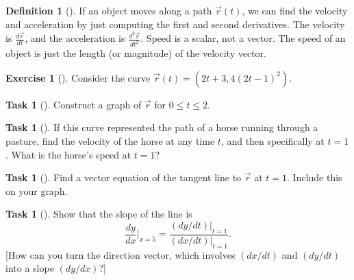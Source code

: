\documentclass[10pt,]{book}
\theoremstyle{plain}
\theoremstyle{definition}
\newtheorem{definition}[theorem]{Definition}
\theoremstyle{definition}
\theoremstyle{definition}
\theoremstyle{definition}
\newtheorem{exploration}[project]{Exercise}
\newtheorem{task}[project]{Task}
\theoremstyle{definition}
\numberwithin{equation}{section}
\newcommand{\ds}{\displaystyle}
\begin{document}
\begin{definition}[{}]\label{def_velocity_acceleration}
If an object moves along a path \(\vec r(t)\), we can find the velocity and acceleration by just computing the first and second derivatives. The velocity is \(\frac{d\vec r}{dt}\), and the acceleration is \(\frac{d^2\vec r}{dt^2}\). Speed is a scalar, not a vector. The speed of an object is just the length (or magnitude) of the velocity vector.%
\end{definition}
\begin{exploration}[]\label{exploration-79}
Consider the curve \(\vec r(t) = (2t+3, 4(2t-1)^2)\).%
\begin{task}[]\label{task-128}
Construct a graph of \(\vec r\) for \(0\leq t\leq 2\).%
\end{task}
\begin{task}[]\label{task-129}
If this curve represented the path of a horse running through a pasture, find the velocity of the horse at any time \(t\), and then specifically at \(t=1\). What is the horse's speed at \(t=1\)?%
\end{task}
\begin{task}[]\label{task-130}
Find a vector equation of the tangent line to \(\vec r\) at \(t=1\).  Include this on your graph.%
\end{task}
\begin{task}[]\label{task-131}
Show that the slope of the line is%
\begin{equation*}
\ds \frac{dy}{dx}\big|_{x=5} 
= 
\frac{
(dy/dt)\big|_{t=1}
}{
(dx/dt)\big|_{t=1}
}.
\end{equation*}
[How can you turn the direction vector, which involves \((dx/dt)\) and \((dy/dt)\) into a slope \((dy/dx)\)?]%
\end{task}
\end{exploration}
\typeout{************************************************}
\typeout{************************************************}
\end{document}
